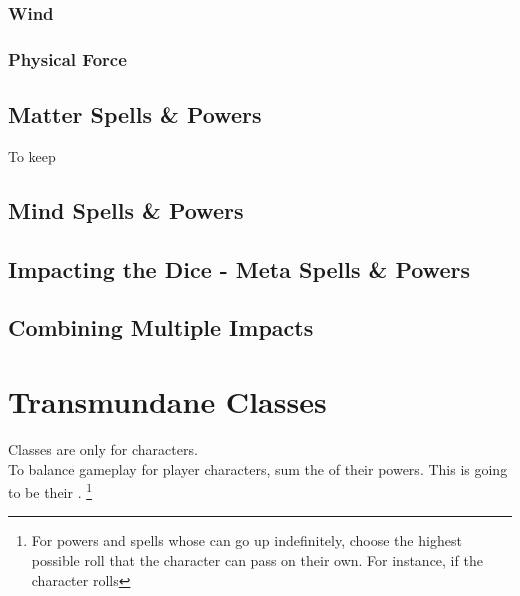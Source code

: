 \documentclass{LegrandOrangeTufteBook}
\begin{document}
\subsubsection*{Wind}

\subsubsection*{Physical Force}

\subsection*{Matter Spells \& Powers}

To keep

\subsection*{Mind Spells \& Powers}

\subsection*{Impacting the Dice - Meta Spells \& Powers}

\subsection*{Combining Multiple Impacts}



\section*{Transmundane Classes}

Classes are only for  characters.\\

To balance gameplay for  player characters,
sum the  of their  powers.
This is going to be their .
\footnote{
    For powers and spells whose  can go up indefinitely, choose the highest possible roll that the character can pass on their own.
    For instance, if the character rolls 
}
\\
\end{document}
